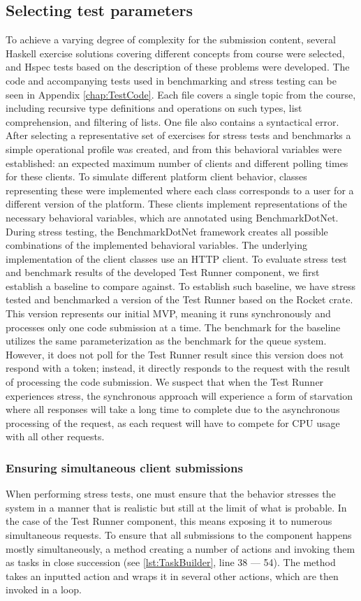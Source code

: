 \subsection{Selecting test parameters}
To achieve a varying degree of complexity for the submission content, several Haskell exercise solutions covering different concepts from course were selected, and Hspec tests based on the description of these problems were developed. 
The code and accompanying tests used in benchmarking and stress testing can be seen in Appendix \ref{chap:TestCode}.
Each file covers a single topic from the course, including recursive type definitions and operations on such types, list comprehension, and filtering of lists. 
One file also contains a syntactical error.
After selecting a representative set of exercises for stress tests and benchmarks a simple operational profile was created, and from this behavioral variables were established: an expected maximum number of clients and different polling times for these clients.
To simulate different platform client behavior, classes representing these were implemented where each class corresponds to a user for a different version of the platform.
These clients implement representations of the necessary behavioral variables, which are annotated using BenchmarkDotNet.
During stress testing, the BenchmarkDotNet framework creates all possible combinations of the implemented behavioral variables.
The underlying implementation of the client classes use an HTTP client.
To evaluate stress test and benchmark results of the developed Test Runner component, we first establish a baseline to compare against.
To establish such baseline, we have stress tested and benchmarked a version of the Test Runner based on the Rocket crate.
This version represents our initial MVP, meaning it runs synchronously and processes only one code submission at a time.
The benchmark for the baseline utilizes the same parameterization as the benchmark for the queue system.
However, it does not poll for the Test Runner result since this version does not respond with a token; instead, it directly responds to the request with the result of processing the code submission.
We suspect that when the Test Runner experiences stress, the synchronous approach will experience a form of starvation where all responses will take a long time to complete due to the asynchronous processing of the request, as each request will have to compete for CPU usage with all other requests.

\subsubsection{Ensuring simultaneous client submissions}
When performing stress tests, one must ensure that the behavior stresses the system in a manner that is realistic but still at the limit of what is probable.
In the case of the Test Runner component, this means exposing it to numerous simultaneous requests. 
To ensure that all submissions to the component happens mostly simultaneously, a method creating a number of actions and invoking them as tasks in close succession (see \ref{lst:TaskBuilder}, line 38 --- 54). 
The method takes an inputted action and wraps it in several other actions, which are then invoked in a loop. 

